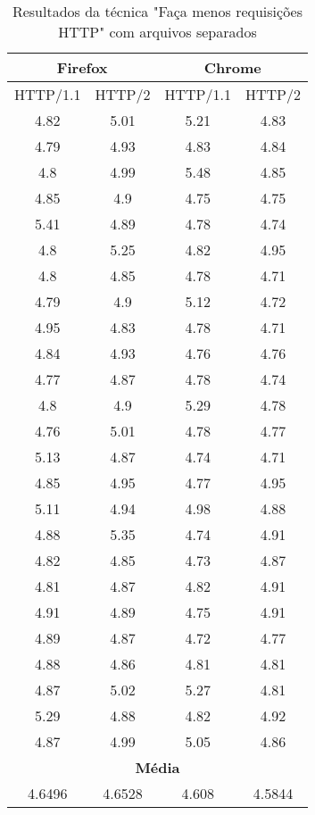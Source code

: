 \begin{table}[h]
	\centering
	\caption{Resultados da técnica "Faça menos requisições HTTP" com arquivos separados}
	\label{resultados-facamenosrequisicoeshttp-separados}
	\begin{tabular}{cccc}
		\hline
		\multicolumn{2}{c}{\textbf{Firefox}} & \multicolumn{2}{c}{\textbf{Chrome}} \\
		\hline
		HTTP/1.1 & HTTP/2 & HTTP/1.1 & HTTP/2 \\
		\hline
		4.82 & 5.01 & 5.21 & 4.83 \\
		4.79 & 4.93 & 4.83 & 4.84 \\
		4.8  & 4.99 & 5.48 & 4.85 \\
		4.85 & 4.9  & 4.75 & 4.75 \\
		5.41 & 4.89 & 4.78 & 4.74 \\
		4.8  & 5.25 & 4.82 & 4.95 \\
		4.8  & 4.85 & 4.78 & 4.71 \\
		4.79 & 4.9  & 5.12 & 4.72 \\
		4.95 & 4.83 & 4.78 & 4.71 \\
		4.84 & 4.93 & 4.76 & 4.76 \\
		4.77 & 4.87 & 4.78 & 4.74 \\
		4.8  & 4.9  & 5.29 & 4.78 \\
		4.76 & 5.01 & 4.78 & 4.77 \\
		5.13 & 4.87 & 4.74 & 4.71 \\
		4.85 & 4.95 & 4.77 & 4.95 \\
		5.11 & 4.94 & 4.98 & 4.88 \\
		4.88 & 5.35 & 4.74 & 4.91 \\
		4.82 & 4.85 & 4.73 & 4.87 \\
		4.81 & 4.87 & 4.82 & 4.91 \\
		4.91 & 4.89 & 4.75 & 4.91 \\
		4.89 & 4.87 & 4.72 & 4.77 \\
		4.88 & 4.86 & 4.81 & 4.81 \\
		4.87 & 5.02 & 5.27 & 4.81 \\
		5.29 & 4.88 & 4.82 & 4.92 \\
		4.87 & 4.99 & 5.05 & 4.86 \\
		\hline
		\multicolumn{4}{c}{\textbf{Média}} \\
		4.6496 & 4.6528 & 4.608 & 4.5844 \\
		\hline
	\end{tabular}
\end{table}